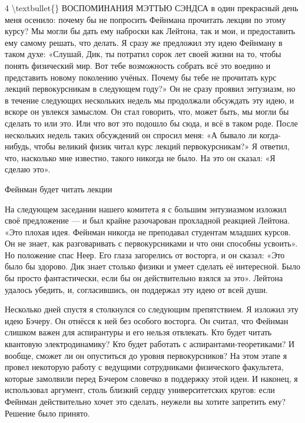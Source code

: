 \documentclass[10pt,oneside]{article}
\begin{document}
4 \textbackslash{}textbullet\{\} ВОСПОМИНАНИЯ МЭТТЬЮ СЭНДСА в один прекрасный день меня осенило: почему бы не попросить Фейнмана прочитать лекции по этому курсу? Мы могли бы дать ему наброски как Лейтона, так и мои, и предоставить ему самому решать, что делать. Я сразу же предложил эту идею Фейнману в таком духе: «Слушай, Дик, ты потратил сорок лет своей жизни на то, чтобы понять физический мир. Вот тебе возможность собрать всё это воедино и представить новому поколению учёных. Почему бы тебе не прочитать курс лекций первокурсникам в следующем году?» Он не сразу проявил энтузиазм, но в течение следующих нескольких недель мы продолжали обсуждать эту идею, и вскоре он увлекся замыслом. Он стал говорить, что, может быть, мы могли бы сделать то или это. Или что вот это подошло бы сюда, и всё в таком роде. После нескольких недель таких обсуждений он спросил меня: «А бывало ли когда-нибудь, чтобы великий физик читал курс лекций первокурсникам?» Я ответил, что, насколько мне известно, такого никогда не было. На это он сказал: «Я сделаю это».\par

Фейнман будет читать лекции\par

На следующем заседании нашего комитета я с большим энтузиазмом изложил своё предложение --- и был крайне разочарован прохладной реакцией Лейтона. «Это плохая идея. Фейнман никогда не преподавал студентам младших курсов. Он не знает, как разговаривать с первокурсниками и что они способны усвоить». Но положение спас Неер. Его глаза загорелись от восторга, и он сказал: «Это было бы здорово. Дик знает столько физики и умеет сделать её интересной. Было бы просто фантастически, если бы он действительно взялся за это». Лейтона удалось убедить, и, согласившись, он поддержал эту идею от всей души.\par

Несколько дней спустя я столкнулся со следующим препятствием. Я изложил эту идею Бэчеру. Он отнёсся к ней без особого восторга. Он считал, что Фейнман слишком важен для аспирантуры и его нельзя отвлекать. Кто будет читать квантовую электродинамику? Кто будет работать с аспирантами-теоретиками? И вообще, сможет ли он опуститься до уровня первокурсников? На этом этапе я провел некоторую работу с ведущими сотрудниками физического факультета, которые замолвили перед Бэчером словечко в поддержку этой идеи. И наконец, я использовал аргумент, столь близкий сердцу университетских кругов: если Фейнман действительно хочет это сделать, неужели вы хотите запретить ему? Решение было принято.\par
\end{document}
